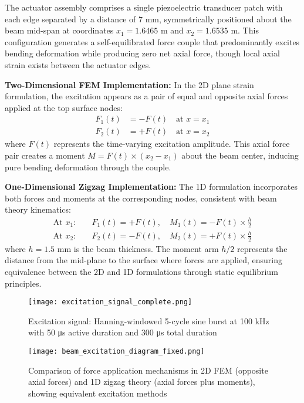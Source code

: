 \documentclass[12pt,a4paper]{report}
\begin{document}
The actuator assembly comprises a single piezoelectric transducer patch with each edge separated by a distance of $7$ mm, symmetrically positioned about the beam mid-span at coordinates $x_1 = 1.6465$ m and $x_2 = 1.6535$ m. This configuration generates a self-equilibrated force couple that predominantly excites bending deformation while producing zero net axial force, though local axial strain exists between the actuator edges.

\textbf{Two-Dimensional FEM Implementation:} In the 2D plane strain formulation, the excitation appears as a pair of equal and opposite axial forces applied at the top surface nodes:
\begin{align}
F_1(t) &= -F(t) \quad \text{at } x = x_1 \\
F_2(t) &= +F(t) \quad \text{at } x = x_2
\end{align}
where $F(t)$ represents the time-varying excitation amplitude. This axial force pair creates a moment $M = F(t) \times (x_2 - x_1)$ about the beam center, inducing pure bending deformation through the couple.

\textbf{One-Dimensional Zigzag Implementation:} The 1D formulation incorporates both forces and moments at the corresponding nodes, consistent with beam theory kinematics:
\begin{align}
\text{At } x_1: \quad & F_1(t) = +F(t), \quad M_1(t) = -F(t) \times \frac{h}{2} \\
\text{At } x_2: \quad & F_2(t) = -F(t), \quad M_2(t) = +F(t) \times \frac{h}{2}
\end{align}
where $h = 1.5$ mm is the beam thickness. The moment arm $h/2$ represents the distance from the mid-plane to the surface where forces are applied, ensuring equivalence between the 2D and 1D formulations through static equilibrium principles.



\begin{figure}[htbp]
\centering
\texttt{[image: excitation\_signal\_complete.png]}
\caption{Excitation signal: Hanning-windowed 5-cycle sine burst at 100 kHz with 50 μs active duration and 300 μs total duration}
\label{fig:excitation_signal}
\end{figure}

 \begin{figure}[htbp]
  \centering
  \texttt{[image: beam\_excitation\_diagram\_fixed.png]}
  \caption{Comparison of force application mechanisms in 2D FEM (opposite axial forces) and 1D
   zigzag theory (axial forces plus moments), showing equivalent excitation methods}
  \label{fig:force_application}
  \end{figure}
\end{document}
